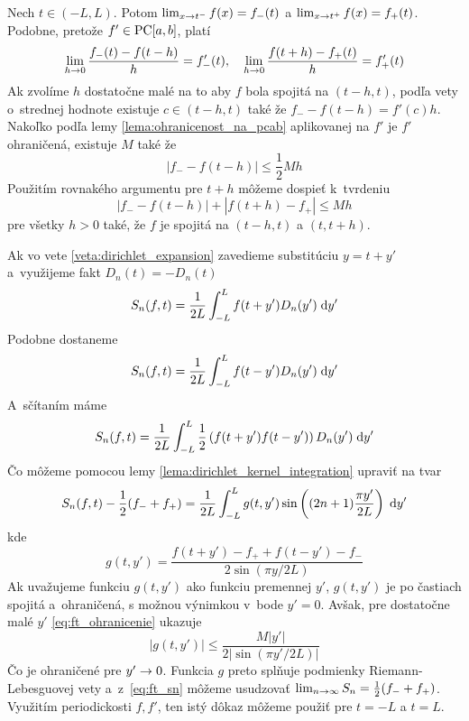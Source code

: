 \begin{dokaz}
    Nech $t \in (-L,L)$. Potom
    $\lim_{x\rightarrow t^-} f(x) = f_-(t)$ a 
    $\lim_{x\rightarrow t^+} f(x) = f_+(t)$.
    Podobne, pretože $f' \in \mbox{PC}[a,b]$, platí
    \begin{equation*}
        \lim_{h\rightarrow 0} \frac{f_-(t) - f(t-h)}{h} = f'_-(t), \quad
        \lim_{h\rightarrow 0} \frac{f(t+h)-f_+(t)}{h} = f'_+(t)
    \end{equation*}
    Ak zvolíme $h$ dostatočne malé na to aby $f$ bola spojitá na
    $(t-h,t)$, podľa vety o~strednej hodnote
    existuje $c \in (t-h,t)$ také že 
    $f_- - f(t-h) = f'(c) h$.
    Nakoľko podľa lemy \ref{lema:ohranicenost_na_pcab} aplikovanej na
    $f'$ je $f'$ ohraničená, existuje $M$ také že
    \begin{equation*}
        |f_- - f(t-h)| \le \frac{1}{2} M h
    \end{equation*}
    Použitím rovnakého argumentu pre $t+h$ môžeme dospieť k~tvrdeniu
    \begin{equation}
        |f_- - f(t-h)| + |f(t+h) - f_+| \le Mh
        \label{eq:ft_ohranicenie}
    \end{equation}
    pre všetky $h>0$ také, že $f$ je spojitá na $(t-h,t)$ a $(t,t+h)$.

    Ak vo vete \ref{veta:dirichlet_expansion} zavedieme substitúciu
    $y=t+y'$ a~využijeme fakt $D_n(t)=-D_n(t)$
    \begin{equation*}
        S_n(f,t) = \frac{1}{2L} \int_{-L}^{L} f(t+y') D_n(y') \; \mathrm{d} y'
    \end{equation*}
    Podobne dostaneme
    \begin{equation*}
        S_n(f,t) = \frac{1}{2L} \int_{-L}^{L} f(t-y') D_n(y') \; \mathrm{d} y'
    \end{equation*}
    A~sčítaním máme
    \begin{equation*}
        S_n(f,t) = \frac{1}{2L} \int_{-L}^{L} \frac{1}{2} 
            \left( f(t+y') f(t-y') \right) D_n(y') \; \mathrm{d} y'
    \end{equation*}
    Čo môžeme pomocou lemy \ref{lema:dirichlet_kernel_integration}
    upraviť na tvar
    \begin{equation}
    S_n(f,t) - \frac{1}{2}(f_-+f_+)= \frac{1}{2L} \int_{-L}^{L} 
        g(t,y') \sin\left( (2n+1)\frac{\pi y'}{2L} \right)\; \mathrm{d} y'
        \label{eq:ft_sn}
    \end{equation}
    kde
    \begin{equation*}
        g(t,y') = \frac{f(t+y')-f_+ + f(t-y')-f_-}{2 \sin(\pi y/ 2L)}
    \end{equation*}
    Ak uvažujeme funkciu $g(t,y')$ ako funkciu premennej $y'$,
    $g(t,y')$ je po častiach spojitá a~ohraničená, s možnou výnimkou
    v~bode $y'=0$. Avšak, pre dostatočne malé $y'$ \eqref{eq:ft_ohranicenie}
    ukazuje
    \begin{equation}
        |g(t,y')|\le \frac{M |y'|}{2|\sin(\pi y'/2L)|}
    \end{equation}
    Čo je ohraničené pre $y'\rightarrow 0$.
    Funkcia $g$ preto splňuje podmienky Riemann-Lebesguovej vety
    a~z~\eqref{eq:ft_sn} môžeme usudzovať
    $\lim_{n\rightarrow\infty} S_n = \frac{1}{2}(f_- + f_+)$.
    Využitím periodickosti $f,f'$, ten istý dôkaz môžeme použiť pre
    $t=-L$ a $t=L$.
\end{dokaz}

